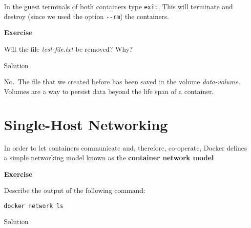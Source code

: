 \documentclass[
]{article}
\newenvironment{infobox}[1]
  {
  \begin{itemize}
  \renewcommand{\labelitemi}{
    \raisebox{-.7\height}[0pt][0pt]{
      
    }
  }
  \setlength{\fboxsep}{1em}
  \begin{whitebox}
  \item
  }
  {
  \end{whitebox}
  \end{itemize}
  }
\theoremstyle{definition}
\theoremstyle{definition}
\theoremstyle{definition}
\theoremstyle{remark}
\let\BeginKnitrBlock\begin \let\EndKnitrBlock\end
\begin{document}
In the guest terminals of both containers type \texttt{exit}.
This will terminate and destroy (since we used
the option \texttt{-\/-rm}) the containers.

\begin{infobox}{exercisebox}

\textbf{Exercise}

\BeginKnitrBlock{exercise}
\protect\hypertarget{exr:unnamed-chunk-30}{}{\label{exr:unnamed-chunk-30} }Will the file \emph{test-file.txt} be removed?
Why?
\EndKnitrBlock{exercise}

\end{infobox}

Solution

\begin{infobox}{exercisebox}

No.~The file that we created before has been saved in the volume
\emph{data-volume}. Volumes are a way to persist data beyond the life span
of a container.

\end{infobox}

\hypertarget{single-host-networking}{%
\section{Single-Host Networking}\label{single-host-networking}}

In order to let containers communicate and, therefore, co-operate,
Docker defines a simple networking model known as
the \href{/courses/cloud-computing/docker-primer\#single-host-networking}{\textbf{container network model}}

\begin{infobox}{exercisebox}

\textbf{Exercise}

\BeginKnitrBlock{exercise}
\protect\hypertarget{exr:unnamed-chunk-31}{}{\label{exr:unnamed-chunk-31} }Describe the output of the following command:

\texttt{docker\ network\ ls}
\EndKnitrBlock{exercise}

\end{infobox}

Solution
\end{document}
